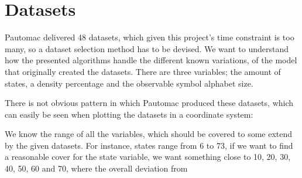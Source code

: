 \section{Datasets}
Pautomac delivered 48 datasets, which given this project's time constraint is too many, so a dataset selection method has to be devised. We want to understand how the presented algorithms handle the different known variations, of the model that originally created the datasets. There are three variables; the amount of states, a density percentage and the observable symbol alphabet size.

There is not obvious pattern in which Pautomac produced these datasets, which can easily be seen when plotting the datasets in a coordinate system:


We know the range of all the variables, which should be covered to some extend by the given datasets. For instance, states range from 6 to 73, if we want to find a reasonable cover for the state variable, we want something close to 10, 20, 30, 40, 50, 60 and 70, where the overall deviation from



